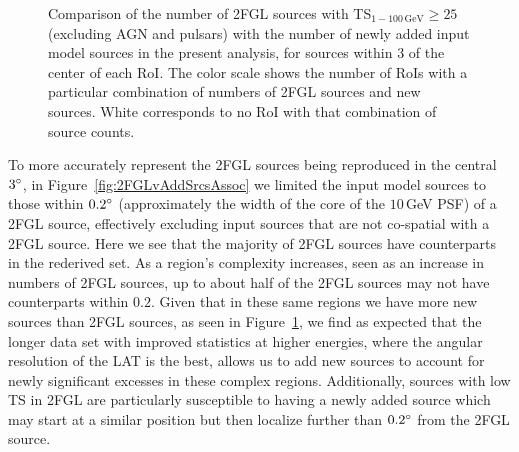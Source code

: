 \begin{figure}[h!]
	\centering
	\caption{Comparison of the number of 2FGL sources with TS$_{1-100\,\mathrm{GeV}} \geq 25$ (excluding AGN and pulsars) with the number of newly added input model sources in the present analysis, for sources within $3$\degr{} of the center of each RoI. The color scale shows the number of RoIs with a particular combination of numbers of 2FGL sources and new sources.
		White corresponds to no RoI with that combination of source counts.}
	\label{fig:2FGLvAddSrcs} 
\end{figure}

To more accurately represent the 2FGL sources being reproduced in the central $3\mbox{$^\circ$}$, in Figure~\ref{fig:2FGLvAddSrcsAssoc} we limited the input model sources to those within $0.2\mbox{$^\circ$}$ (approximately the width of the core of the $10$\,GeV PSF) of a 2FGL source, effectively excluding input sources that are not co-spatial with a 2FGL source. Here we see that the majority of 2FGL sources have counterparts in the rederived set. 
As a region's complexity increases, seen as an increase in numbers of 2FGL sources, up to about half of the 2FGL sources may not have counterparts within $0.2$\degr. Given that in these same regions we have more new sources than 2FGL sources, as seen in Figure~\ref{fig:2FGLvAddSrcs}, we find as expected that the longer data set with improved statistics at higher energies, where the angular resolution of the LAT is the best, allows us to add new sources to account for newly significant excesses in these complex regions. 
Additionally, sources with low TS in 2FGL are particularly susceptible to having a newly added source which may start at a similar position but then localize further than $0.2\mbox{$^\circ$}$ from the 2FGL source. 

